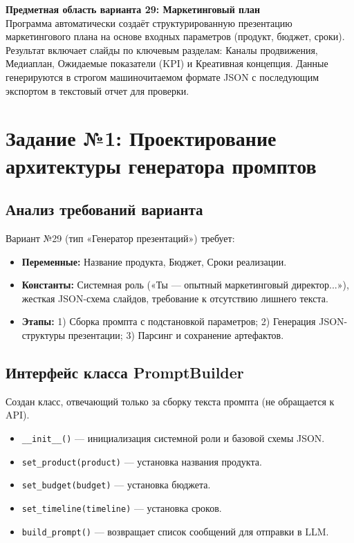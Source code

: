 \documentclass[oneside,a4paper,14pt]{extarticle}
\begin{document}
	\noindent
	\textbf{Предметная область варианта 29: Маркетинговый план} \\
	Программа автоматически создаёт структурированную презентацию маркетингового плана на основе входных параметров (продукт, бюджет, сроки). Результат включает слайды по ключевым разделам: Каналы продвижения, Медиаплан, Ожидаемые показатели (KPI) и Креативная концепция. Данные генерируются в строгом машиночитаемом формате JSON с последующим экспортом в текстовый отчет для проверки.
	\newpage
	
	\section{Задание №1: Проектирование архитектуры генератора промптов}
	\subsection{Анализ требований варианта}
	\noindent
	Вариант №29 (тип «Генератор презентаций») требует:
	\begin{itemize}
		\item \textbf{Переменные:} Название продукта, Бюджет, Сроки реализации.
		\item \textbf{Константы:} Системная роль («Ты — опытный маркетинговый директор...»), жесткая JSON-схема слайдов, требование к отсутствию лишнего текста.
		\item \textbf{Этапы:} 1) Сборка промпта с подстановкой параметров; 2) Генерация JSON-структуры презентации; 3) Парсинг и сохранение артефактов.
	\end{itemize}
	
	\subsection{Интерфейс класса PromptBuilder}
	\noindent
	Создан класс, отвечающий только за сборку текста промпта (не обращается к API).
	\begin{itemize}
		\item \texttt{\_\_init\_\_()} --- инициализация системной роли и базовой схемы JSON.
		\item \texttt{set\_product(product)} --- установка названия продукта.
		\item \texttt{set\_budget(budget)} --- установка бюджета.
		\item \texttt{set\_timeline(timeline)} --- установка сроков.
		\item \texttt{build\_prompt()} --- возвращает список сообщений для отправки в LLM.
	\end{itemize}
	
\end{document}
